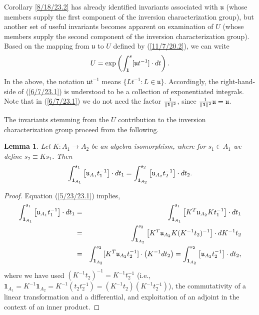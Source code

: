 \documentclass{amsart}
\numberwithin{equation}{section}
\newtheorem{lemma}[theorem]{Lemma}
\theoremstyle{definition}
\numberwithin{theorem}{section}
\begin{document}
Corollary \ref{8/18/23.2} has already identified invariants associated with $\mathfrak{u}$ (whose members supply the first component of the inversion characterization group), but another set of useful invariants becomes apparent on examination of $U$ (whose members supply the second component of the inversion characterization group).  Based on the mapping from $\mathfrak{u}$ to $ U$ defined by (\ref{11/7/20.2}),  we can write \begin{equation}  U = \exp\left(\int_{\bf 1}^s [\mathfrak{u}t^{-1}]\cdot dt\right). \label{6/7/23.1}\end{equation}  In the above, the notation $\mathfrak{u}t^{-1}$ means $\{Lt^{-1}: L\in \mathfrak{u}\}$.  Accordingly, the right-hand-side of (\ref{6/7/23.1}) is understood to be a collection of exponentiated integrals.   Note that in (\ref{6/7/23.1}) we do not need the factor $\frac{1}{\|{\bf 1}\|^2}$, since $\frac{1}{\|{\bf 1}\|^2}\mathfrak{u}=\mathfrak{u}$.  

The invariants stemming from the $U$ contribution to the inversion characterization group proceed from the following. 


\begin{lemma}\label{6/6/23.2} Let $K:A_1\rightarrow A_2$ be an algebra isomorphism, where for $s_1\in A_1$ we define $s_2\equiv Ks_1$.  Then \[ \int_{{\bf 1}_{A_1}}^{s_1} \left[\mathfrak{u}_{A_1}t_1^{-1}\right]\cdot dt_1 
= \int_{{\bf 1}_{A_2}}^{s_2} \left[\mathfrak{u}_{A_2}t_2^{-1}\right]\cdot dt_2 . \] \end{lemma}

\begin{proof} 
Equation (\ref{5/23/23.1}) implies,
\begin{eqnarray*} \int_{{\bf 1}_{A_1}}^{s_1} \left[\mathfrak{u}_{A_1}t_1^{-1}\right]\cdot dt_1 &=& \int_{{\bf 1}_{A_1}}^{s_1} \left[ K^T\mathfrak{u}_{A_2}Kt_1^{-1}\right]\cdot dt_1 \\ &=& 
\int_{{\bf 1}_{A_2}}^{s_2} \left[ K^T\mathfrak{u}_{A_2}K (K^{-1}t_2)^{-1}\right]\cdot dK^{-1}t_2 \\ &=& \int_{{\bf 1}_{A_2}}^{s_2} [K^T\mathfrak{u}_{A_2}t_2^{-1}]\cdot \left(K^{-1}dt_2\right) = \int_{{\bf 1}_{A_2}}^{s_2} \left[\mathfrak{u}_{A_2}t_2^{-1}\right]\cdot dt_2, 
\end{eqnarray*}
where we have used $(K^{-1}t_2)^{-1} = K^{-1}t_2^{-1}$ (i.e., $\mathbf{1}_{A_1} = K^{-1}\mathbf{1}_{A_2} = K^{-1}(t_2t_2^{-1}) = (K^{-1}t_2)(K^{-1}t_2^{-1})$), the commutativity of a linear transformation and a differential, and exploitation of an adjoint in the context of an inner product.
\end{proof}
\end{document}
